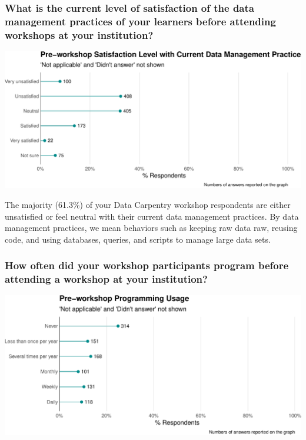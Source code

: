 \documentclass[]{article}
\makeatletter
\def\maxwidth{\ifdim\Gin@nat@width>\linewidth\linewidth\else\Gin@nat@width\fi}
\makeatother
\begin{document}
\subsubsection{What is the current level of satisfaction of the data
management practices of your learners before attending workshops at your
institution?}\label{what-is-the-current-level-of-satisfaction-of-the-data-management-practices-of-your-learners-before-attending-workshops-at-your-institution}

\includegraphics[width=\maxwidth]{../figures/dc-satisfaction-level-plot-1}

The majority (61.3\%) of your Data Carpentry workshop respondents are
either unsatisfied or feel neutral with their current data management
practices. By data management practices, we mean behaviors such as
keeping raw data raw, reusing code, and using databases, queries, and
scripts to manage large data sets.

\subsubsection{How often did your workshop participants program before
attending a workshop at your
institution?}\label{how-often-did-your-workshop-participants-program-before-attending-a-workshop-at-your-institution}

\includegraphics[width=\maxwidth]{../figures/dc-programming-level-plot-1}
\end{document}
